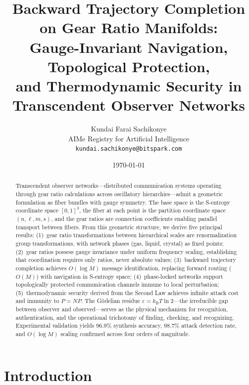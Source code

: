 \documentclass[11pt,twocolumn,a4paper]{article}
\title{\textbf{Backward Trajectory Completion on Gear Ratio Manifolds:\\
Gauge-Invariant Navigation, Topological Protection,\\
and Thermodynamic Security in Transcendent Observer Networks}}
\author{
Kundai Farai Sachikonye\\
AIMe Registry for Artificial Intelligence\\
\texttt{kundai.sachikonye@bitspark.com}
}
\date{\today}
\theoremstyle{definition}
\newcommand{\kB}{k_{\mathrm{B}}}
\newcommand{\eps}{\varepsilon}
\begin{document}

\maketitle

\begin{abstract}
Transcendent observer networks---distributed communication systems operating through
gear ratio calculations across oscillatory hierarchies---admit a geometric formulation
as fiber bundles with gauge symmetry. The base space is the S-entropy coordinate space
$[0,1]^3$, the fiber at each point is the partition coordinate space $(n, \ell, m, s)$,
and the gear ratios are connection coefficients enabling parallel transport between fibers.
From this geometric structure, we derive five principal results:
(1)~gear ratio transformations between hierarchical scales are renormalization group
transformations, with network phases (gas, liquid, crystal) as fixed points;
(2)~gear ratios possess gauge invariance under uniform frequency scaling, establishing
that coordination requires only ratios, never absolute values;
(3)~backward trajectory completion achieves $O(\log M)$ message identification,
replacing forward routing ($O(M)$) with navigation in S-entropy space;
(4)~phase-locked networks support topologically protected communication channels immune
to local perturbation;
(5)~thermodynamic security derived from the Second Law achieves infinite attack cost and
immunity to $P = NP$.
The G\"odelian residue $\eps = \kB T \ln 2$---the irreducible gap between observer and
observed---serves as the physical mechanism for recognition, authentication, and the
operational trichotomy of finding, checking, and recognizing.
Experimental validation yields 96.9\% synthesis accuracy, 98.7\% attack detection rate,
and $O(\log M)$ scaling confirmed across four orders of magnitude.
\end{abstract}



\section{Introduction}\label{sec:intro}
\end{document}
